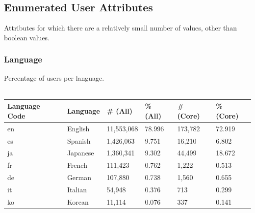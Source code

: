 \subsection{Enumerated User Attributes}
Attributes for which there are a relatively small number of values, other than boolean values.
\subsubsection{Language}
Percentage of users per language.\\\\
\begin{tabular}{| l | l | l | l | l | l | }
\hline
\textbf{Language Code} & \textbf{Language} & \textbf{\# (All)}  & \textbf{\% (All)} & \textbf{\# (Core)}  & \textbf{\% (Core)} \\ \hline
en & English & 11,553,068 & 78.996 & 173,782 & 72.919 \\ \hline
es & Spanish & 1,426,063 & 9.751 & 16,210 & 6.802 \\ \hline
ja & Japanese & 1,360,341 & 9.302 & 44,499 & 18.672 \\ \hline
fr & French & 111,423 & 0.762 & 1,222 & 0.513 \\ \hline
de & German & 107,880 & 0.738 & 1,560 & 0.655 \\ \hline
it & Italian & 54,948 & 0.376 & 713 & 0.299 \\ \hline
ko & Korean & 11,114 & 0.076 & 337 & 0.141 \\ \hline
\end{tabular}

